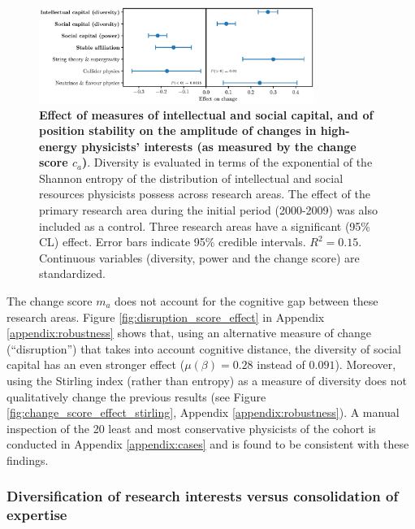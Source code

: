\documentclass{article}
\begin{document}
\begin{figure}[h]
    \centering
    \includegraphics[width=0.8\textwidth]{plots/change_score_effects_entropy_magnitude.eps}
    \caption{\textbf{Effect of measures of intellectual and social capital, and of position stability on the amplitude of changes in high-energy physicists' interests (as measured by the change score $c_a$)}. Diversity is evaluated in terms of the exponential of the Shannon entropy of the distribution of intellectual and social resources physicists possess across research areas. The effect of the primary research area during the initial period (2000-2009) was also included as a control. Three research areas have a significant (95\% CL) effect. Error bars indicate 95\% credible intervals. $R^2=0.15$. Continuous variables (diversity, power and the change score) are standardized.}
    \label{fig:change_score_effect}
\end{figure}

The change score $m_a$ does not account for the cognitive gap between these research areas. Figure \ref{fig:disruption_score_effect} in Appendix \ref{appendix:robustness} shows that, using an alternative measure of change (``disruption'') that takes into account cognitive distance, the diversity of social capital has an even stronger effect ($\mu(\beta)=0.28$ instead of $0.091$). Moreover, using the Stirling index (rather than entropy) as a measure of diversity does not qualitatively change the previous results (see Figure \ref{fig:change_score_effect_stirling}, Appendix \ref{appendix:robustness}). A manual inspection of the 20 least and most conservative physicists of the cohort is conducted in Appendix \ref{appendix:cases} and is found to be consistent with these findings.

\subsubsection{Diversification of research interests versus consolidation of expertise}
\end{document}
